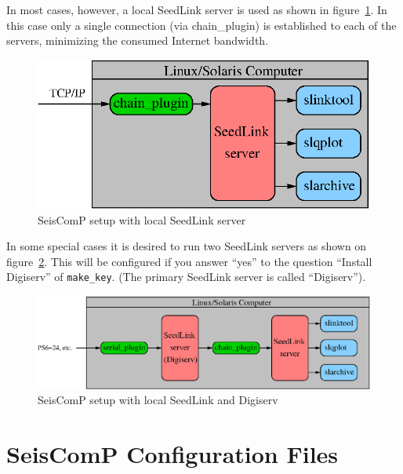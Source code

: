 \documentclass[11pt,a4paper,titlepage]{article}
\begin{document}
In most cases, however, a local SeedLink server is used as shown in
figure~\ref{scheme2}. In this case only a single connection (via
chain\_plugin) is established to each of the servers, minimizing the
consumed Internet bandwidth.

\begin{figure}[p!]
\centering
\includegraphics{scheme2.eps}
\caption{SeisComP setup with local SeedLink server} \label{scheme2}
\end{figure}

In some special cases it is desired to run two SeedLink servers as shown
on figure~\ref{scheme3}. This will be configured if you answer ``yes'' to
the question ``Install Digiserv'' of \verb+make_key+. (The primary SeedLink
server is called ``Digiserv'').

\begin{figure}[p!]
\centering
\includegraphics{scheme3.eps}
\caption{SeisComP setup with local SeedLink and Digiserv} \label{scheme3}
\end{figure}


\section{SeisComP Configuration Files}
\end{document}
